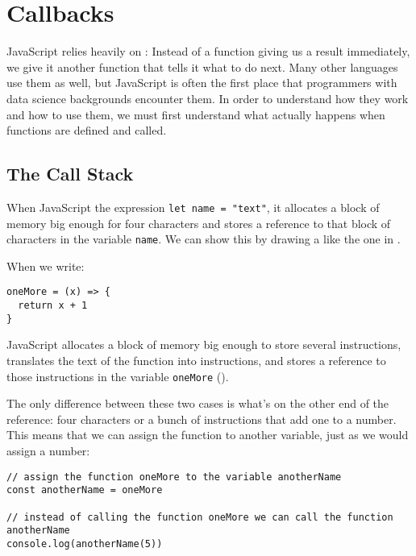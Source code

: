 \chapter{Callbacks}\label{s:callbacks}

JavaScript relies heavily on :
Instead of a function giving us a result immediately,
we give it another function that tells it what to do next.
Many other languages use them as well,
but JavaScript is often the first place that programmers with data science backgrounds encounter them.
In order to understand how they work and how to use them,
we must first understand what actually happens when functions are defined and called.

\section{The Call Stack}\label{s:callbacks-callstack}

When JavaScript  the expression \texttt{let\ name\ =\ "text"},
it allocates a block of memory big enough for four characters
and stores a reference to that block of characters in the variable \texttt{name}.
We can show this by drawing a 
like the one in .


When we write:

\begin{verbatim}
oneMore = (x) => {
  return x + 1
}
\end{verbatim}

JavaScript allocates a block of memory big enough to store several instructions,
translates the text of the function into instructions,
and stores a reference to those instructions in the variable \texttt{oneMore}
().


The only difference between these two cases is what's on the other end of the reference:
four characters or a bunch of instructions that add one to a number.
This means that we can assign the function to another variable,
just as we would assign a number:

\begin{verbatim}
// assign the function oneMore to the variable anotherName 
const anotherName = oneMore

// instead of calling the function oneMore we can call the function anotherName
console.log(anotherName(5))
\end{verbatim}

